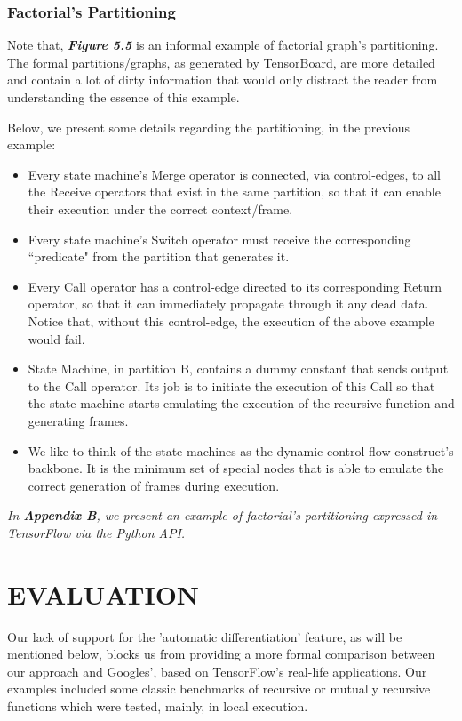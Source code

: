 \documentclass[ack,preface]{dithesis}
\begin{document}
    \subsection{Factorial's Partitioning}

Note that, \textit{\textbf{Figure 5.5}} is an informal example of factorial graph's partitioning. The formal partitions/graphs, as generated by TensorBoard, are more detailed and contain a lot of dirty information that would only distract the reader from understanding the essence of this example.  

Below, we present some details regarding the partitioning, in the previous example:
    
\begin{itemize}
    \item Every state machine's Merge operator is connected, via control-edges, to all the Receive operators that exist in the same partition, so that it can enable their execution under the correct context/frame.
    \item Every state machine's Switch operator must receive the corresponding ``predicate" from the partition that generates it.
    \item Every Call operator has a control-edge directed to its corresponding Return operator, so that it can immediately propagate through it any dead data. Notice that, without this control-edge, the execution of the above example would fail.
    \item State Machine, in partition B, contains a dummy constant that sends output to the Call operator. Its job is to initiate the execution of this Call so that the state machine starts emulating the execution of the recursive function and generating frames.
    \item We like to think of  the state machines as the dynamic control flow construct's backbone. It is the minimum set of special nodes that  is able to emulate the correct generation of frames during execution.
    \end{itemize}

\textit{In \textbf{Appendix B}, we present an example of factorial's partitioning expressed in TensorFlow via the Python API.}


\chapter{EVALUATION}

Our lack of support for the 'automatic differentiation' feature, as will be mentioned below, blocks us from providing a more formal comparison between our approach and Googles', based on TensorFlow's real-life applications. 
Our examples included some classic benchmarks of recursive or mutually recursive functions which were tested, mainly, in local execution.
\end{document}
